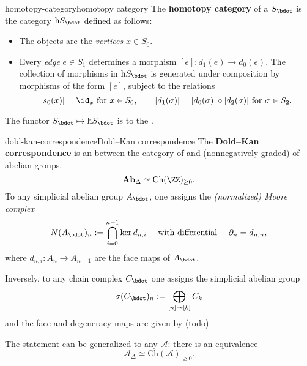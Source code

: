 \begin{topic}{homotopy-category}{homotopy category}
    The \textbf{homotopy category} of a  $S_\bdot$ is the category $\text{h}S_\bdot$ defined as follows:
    \begin{itemize}
        \item The objects are the \textit{vertices} $x \in S_0$.
        \item Every \textit{edge} $e \in S_1$ determines a morphism $[e] : d_1(e) \to d_0(e)$. The collection of morphisms in $\text{h}S_\bdot$ is generated under composition by morphisms of the form $[e]$, subject to the relations
        \[ [s_0(x)] = \id_x \text{ for } x \in S_0, \qquad [d_1(\sigma)] = [d_0(\sigma)] \circ [d_2(\sigma)] \text{ for } \sigma \in S_2 . \]
    \end{itemize}
    
    The functor $S_\bdot \mapsto \text{h}S_\bdot$ is  to the .
\end{topic}

\begin{topic}{dold-kan-correspondence}{Dold--Kan correspondence}
    The \textbf{Dold--Kan correspondence} is an  between the category of   and (nonnegatively graded)  of abelian groups,
    \[ \textbf{Ab}_\Delta \simeq \text{Ch}(\ZZ)_{\ge 0} . \]
    To any simplicial abelian group $A_\bdot$, one assigns the \textit{(normalized) Moore complex}
    \[ N(A_\bdot)_n := \bigcap_{i = 0}^{n - 1} \ker d_{n, i} \quad \text{ with differential } \quad \partial_n = d_{n, n}, \]
    where $d_{n, i} : A_n \to A_{n - 1}$ are the face maps of $A_\bdot$.
    
    Inversely, to any chain complex $C_\bdot$ one assigns the simplicial abelian group
    \[ \sigma(C_\bdot)_n := \bigoplus_{[n] \twoheadrightarrow [k]} C_k \]
    and the face and degeneracy maps are given by (todo).
    
    The statement can be generalized to any  $\mathcal{A}$: there is an equivalence
    \[ \mathcal{A}_\Delta \simeq \text{Ch}(\mathcal{A})_{\ge 0} . \]
\end{topic}
